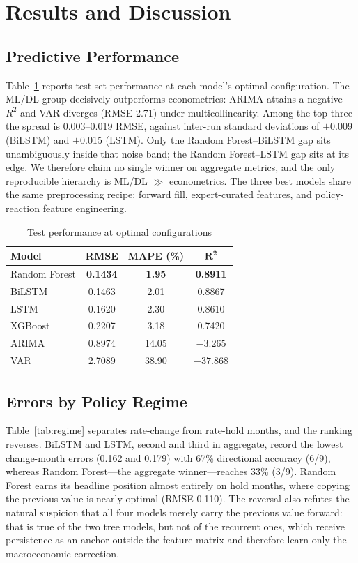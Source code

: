\documentclass[conference]{IEEEtran}
\begin{document}
\section{Results and Discussion}
\subsection{Predictive Performance}
Table~\ref{tab:results} reports test-set performance at each model's optimal configuration. The ML/DL group decisively outperforms econometrics: ARIMA attains a negative $R^2$ and VAR diverges (RMSE 2.71) under multicollinearity. Among the top three the spread is 0.003--0.019 RMSE, against inter-run standard deviations of $\pm$0.009 (BiLSTM) and $\pm$0.015 (LSTM). Only the Random Forest--BiLSTM gap sits unambiguously inside that noise band; the Random Forest--LSTM gap sits at its edge. We therefore claim no single winner on aggregate metrics, and the only reproducible hierarchy is ML/DL $\gg$ econometrics. The three best models share the same preprocessing recipe: forward fill, expert-curated features, and policy-reaction feature engineering.

\begin{table}[htbp]
\caption{Test performance at optimal configurations}
\begin{center}
\begin{tabular}{lccc}
\toprule
\textbf{Model} & \textbf{RMSE} & \textbf{MAPE (\%)} & $\boldsymbol{R^2}$ \\
\midrule
Random Forest & \textbf{0.1434} & \textbf{1.95} & \textbf{0.8911} \\
BiLSTM & 0.1463 & 2.01 & 0.8867 \\
LSTM & 0.1620 & 2.30 & 0.8610 \\
XGBoost & 0.2207 & 3.18 & 0.7420 \\
ARIMA & 0.8974 & 14.05 & $-3.265$ \\
VAR & 2.7089 & 38.90 & $-37.868$ \\
\bottomrule
\end{tabular}
\label{tab:results}
\end{center}
\end{table}

\subsection{Errors by Policy Regime}
Table~\ref{tab:regime} separates rate-change from rate-hold months, and the ranking reverses. BiLSTM and LSTM, second and third in aggregate, record the lowest change-month errors (0.162 and 0.179) with 67\% directional accuracy (6/9), whereas Random Forest---the aggregate winner---reaches 33\% (3/9). Random Forest earns its headline position almost entirely on hold months, where copying the previous value is nearly optimal (RMSE 0.110). The reversal also refutes the natural suspicion that all four models merely carry the previous value forward: that is true of the two tree models, but not of the recurrent ones, which receive persistence as an anchor outside the feature matrix and therefore learn only the macroeconomic correction.
\end{document}
